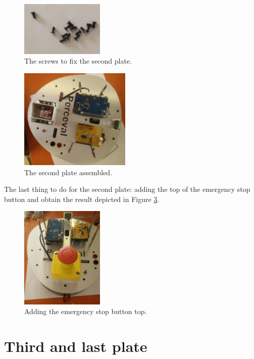 \documentclass[10pt,a4paper]{report}   %
\begin{document}
\begin{figure}[H]
\center
\includegraphics[width=150px]{images/72.jpg}
\caption{The screws to fix the second plate.}
\label{fig:72}
\end{figure}


\begin{figure}[H]
\center
\includegraphics[width=200px]{images/73.jpg}
\caption{The second plate assembled.}
\label{fig:73}
\end{figure}

The last thing to do for the second plate: adding the top of the emergency stop button and obtain the result depicted in Figure \ref{fig:74}.

\begin{figure}[H]
\center
\includegraphics[width=150px]{images/74.jpg}
\caption{Adding the emergency stop button top.}
\label{fig:74}
\end{figure}



\chapter{Third and last plate}
\end{document}
